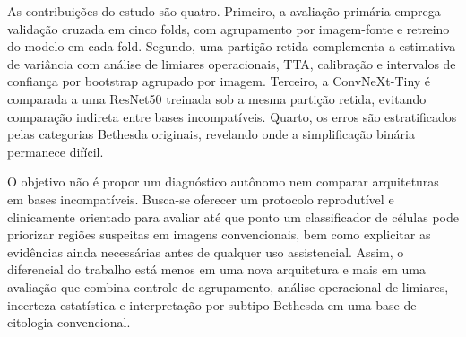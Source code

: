 As contribuições do estudo são quatro. Primeiro, a avaliação primária emprega
validação cruzada em cinco folds, com agrupamento por imagem-fonte e retreino
do modelo em cada fold. Segundo, uma partição retida complementa a estimativa
de variância com análise de limiares operacionais, TTA, calibração e intervalos
de confiança por bootstrap agrupado por imagem. Terceiro, a ConvNeXt-Tiny é
comparada a uma ResNet50 treinada sob a mesma partição retida, evitando
comparação indireta entre bases incompatíveis. Quarto, os erros são
estratificados pelas categorias Bethesda originais, revelando onde a
simplificação binária permanece difícil.

O objetivo não é propor um diagnóstico autônomo nem comparar arquiteturas em
bases incompatíveis. Busca-se oferecer um protocolo reprodutível e
clinicamente orientado para avaliar até que ponto um classificador de células
pode priorizar regiões suspeitas em imagens convencionais, bem como explicitar
as evidências ainda necessárias antes de qualquer uso assistencial. Assim, o
diferencial do trabalho está menos em uma nova arquitetura e mais em uma
avaliação que combina controle de agrupamento, análise operacional de limiares,
incerteza estatística e interpretação por subtipo Bethesda em uma base de
citologia convencional.
